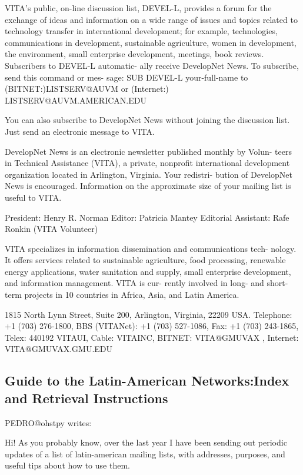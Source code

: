 VITA's public, on-line discussion list, DEVEL-L, provides a forum for
the exchange of ideas and information on a wide range of issues and
topics related to technology transfer in international development; for
example, technologies, communications in development, sustainable
agriculture, women in development, the environment, small enterprise
development, meetings, book reviews. Subscribers to DEVEL-L automatic-
ally receive DevelopNet News. To subscribe, send this command or mes-
sage: SUB DEVEL-L your-full-name  to (BITNET:)LISTSERV@AUVM or
(Internet:) LISTSERV@AUVM.AMERICAN.EDU
 
You can also subscribe to DevelopNet News without joining the discussion
list. Just send an electronic message to VITA.
 
DevelopNet News is an electronic newsletter published monthly by Volun-
teers in Technical Assistance (VITA), a private, nonprofit international
development organization located in Arlington, Virginia. Your redistri-
bution of DevelopNet News is encouraged. Information on the approximate
size of your mailing list is useful to VITA.
 
          President: Henry R. Norman
          Editor: Patricia Mantey
          Editorial Assistant: Rafe Ronkin (VITA Volunteer)
 
VITA specializes in information dissemination and communications tech-
nology. It offers services related to sustainable agriculture, food
processing, renewable energy applications, water sanitation and supply,
small enterprise development, and information management. VITA is cur-
rently involved in long- and short-term projects in 10 countries in
Africa, Asia, and Latin America.

1815 North Lynn Street, Suite 200, Arlington, Virginia, 22209 USA.
Telephone: +1 (703) 276-1800, BBS (VITANet): +1 (703) 527-1086, Fax: +1
(703) 243-1865, Telex: 440192 VITAUI, Cable: VITAINC, BITNET:
VITA@GMUVAX , Internet:  VITA@GMUVAX.GMU.EDU


\subsection{Guide to the Latin-American Networks:Index and Retrieval
Instructions}             

PEDRO@ohstpy writes:

Hi! As you probably know, over the last year I have been sending out
periodic updates of a list of latin-american mailing lists, with
addresses, purposes, and useful tips about how to use them.

